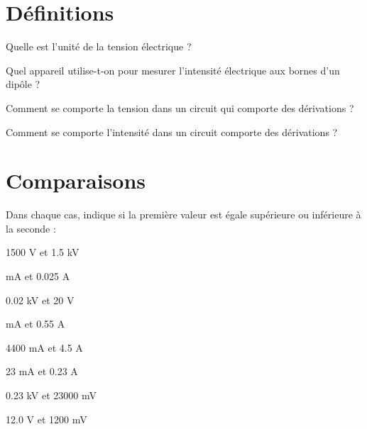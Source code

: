 \section{Définitions}

\begin{questions}
	\question Quelle est l'unité de la tension électrique ?
	
	\fillwithdottedlines{1cm}
	
	\question Quel appareil utilise-t-on pour mesurer l'intensité électrique aux bornes d'un dipôle ?
	\fillwithdottedlines{1cm}
	
	
	\question Comment se comporte la tension dans un circuit qui comporte des dérivations ?
	\fillwithdottedlines{3cm}
	
	\question Comment se comporte l'intensité dans un circuit comporte des dérivations ?
	\fillwithdottedlines{3cm}
	
\end{questions}

\section{Comparaisons}

Dans chaque cas, indique si la première valeur est égale supérieure ou inférieure à la seconde :

\begin{multicols}{2}
	\begin{questions}
		
		\question \num{1500} V et \num{1.5} kV \\
		\fillwithdottedlines{1cm}
		
		 mA et \num{0.025} A\\
		\fillwithdottedlines{1cm}
		
		\question \num{0.02} kV et \num{20} V\\
		\fillwithdottedlines{1cm}
		
		 mA et \num{0.55} A\\
		\fillwithdottedlines{1cm}
		
		\question \num{4400} mA et \num{4.5} A\\
		\fillwithdottedlines{1cm}
		
		\question \num{23} mA et \num{0.23} A\\
		\fillwithdottedlines{1cm}
		
		\question \num{0.23} kV et \num{23000} mV\\		
		\fillwithdottedlines{1cm}
		
		\question \num{12.0} V et \num{1200} mV\\		
		\fillwithdottedlines{1cm}
		
	\end{questions}
	
\end{multicols}

